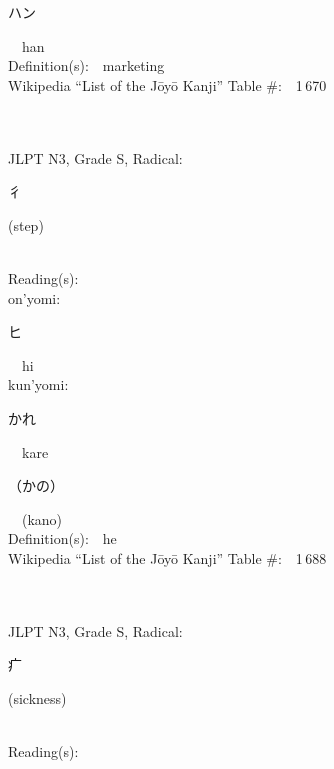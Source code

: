\begin{multicols}{2}
{\hspace*{2em}}{\begin{CJK}{UTF8}{min} ハン \end{CJK}}\ \ han\ \ \\
Definition(s):\ \ marketing \\
Wikipedia ``List of the J\=oy\=o Kanji'' Table \#:\ \ 1\,670 \\
\ \ \\
{\fontsize{34pt}{40pt}  }\ \ \\  %
{JLPT N3, Grade S, Radical:\ \ {\begin{CJK}{UTF8}{min} 彳 \end{CJK}} (step) } \\
Reading(s):\ \ \\
{\hspace*{1em}}on'yomi:\ \ \\
{\hspace*{2em}}{\begin{CJK}{UTF8}{min} ヒ \end{CJK}}\ \ hi\ \ \\
{\hspace*{1em}}kun'yomi:\ \ \\
{\hspace*{2em}}{\begin{CJK}{UTF8}{min} かれ \end{CJK}}\ \ kare\ \ \\
{\hspace*{2em}}{\begin{CJK}{UTF8}{min} （かの） \end{CJK}}\ \ (kano)\ \ \\
Definition(s):\ \ he \\
Wikipedia ``List of the J\=oy\=o Kanji'' Table \#:\ \ 1\,688 \\
\ \ \\
{\fontsize{34pt}{40pt}  }\ \ \\  %
{JLPT N3, Grade S, Radical:\ \ {\begin{CJK}{UTF8}{min} 疒 \end{CJK}} (sickness) } \\
Reading(s):\ \ \\

\end{multicols}
